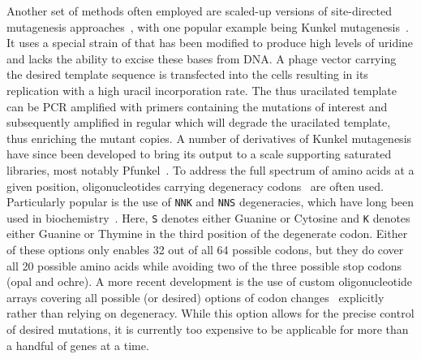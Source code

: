 Another set of methods often employed are scaled-up versions of site-directed mutagenesis approaches~\cite{hutchison_mutagenesis_1978,seyfang_multiple_2004,firnberg_pfunkel:_2012}, with one popular example being Kunkel mutagenesis~\cite{kunkel_rapid_1985}. It uses a special strain of  that has been modified to produce high levels of uridine and lacks the ability to excise these bases from DNA. A phage vector carrying the desired template sequence is transfected into the cells resulting in its replication with a high uracil incorporation rate. The thus uracilated template can be PCR amplified with primers containing the mutations of interest and subsequently amplified in regular  which will degrade the uracilated template, thus enriching the mutant copies. A number of derivatives of Kunkel mutagenesis have since been developed to bring its output to a scale supporting saturated libraries, most notably Pfunkel~\cite{firnberg_pfunkel:_2012}.
To address the full spectrum of amino acids at a given position, oligonucleotides carrying degeneracy codons~\cite{pal_methods_2005} are often used. Particularly popular is the use of \texttt{NNK} and \texttt{NNS} degeneracies, which have long been used in biochemistry~\cite{scott_searching_1990,barbas_semisynthetic_1992}. Here, \texttt{S} denotes either Guanine or Cytosine and \texttt{K} denotes either Guanine or Thymine in the third position of the degenerate codon. Either of these options only enables 32 out of all 64 possible codons, but they do cover all 20 possible amino acids while avoiding two of the three possible stop codons (opal and ochre). A more recent development is the use of custom oligonucleotide arrays covering all possible (or desired) options of codon changes~\cite{kitzman_massively_2015} explicitly rather than relying on degeneracy. While this option allows for the precise control of desired mutations, it is currently too expensive to be applicable for more than a handful of genes at a time.

